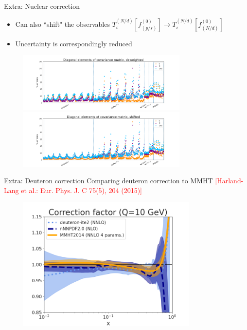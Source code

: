 \documentclass{beamer}
\begin{document}
\begin{frame}{Extra: Nuclear correction}
\begin{itemize}
\item Can also ``shift" the observables $T_i^{(N/d)}[f_(p/s)^{(0)}] \to T_i^{(N/d)}[f_{(N/d)}^{(0)}]$
\item Uncertainty is correspondingly reduced
\end{itemize}
  \begin{figure}
    \includegraphics[width=85mm]{nuclear_uncs/diagnuc_title.png}
    \includegraphics[width=85mm]{nuclear_uncs/diagnucshift.png}
  \end{figure}
\end{frame}
\begin{frame}{Extra: Deuteron correction}
Comparing deuteron correction to MMHT \tiny{ \textcolor{red}{[Harland-Lang et al.: Eur. Phys. J. C 75(5), 204 (2015)]}}
  \begin{figure}
    \includegraphics[width=90mm]{nuclear_uncs/corrfactor.png}
  \end{figure}
\end{frame}
\end{document}
